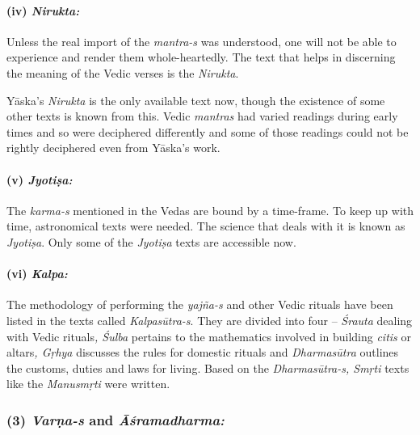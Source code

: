 \paragraph*{(iv) \textit{Nirukta:}}

\vskip -7.3pt

Unless the real import of the \textit{mantra-s} was understood, one will not be able to experience and render them whole-heartedly. The text that helps in discerning the meaning of the Vedic verses is the \textit{Nirukta}.

Yāska’s \textit{Nirukta} is the only available text now, though the existence of some other texts is known from this. Vedic \textit{mantras} had varied readings during early times and so were deciphered differently and some of those readings could not be rightly deciphered even from Yāska’s work.


\paragraph*{(v) \textit{Jyotiṣa:}}

\vskip -7.3pt

The \textit{karma-s} mentioned in the Vedas are bound by a time-frame. To keep up with time, astronomical texts were needed. The science that deals with it is known as \textit{Jyotiṣa}. Only some of the \textit{Jyotiṣa} texts are accessible now.


\paragraph*{(vi) \textit{Kalpa:}}

\vskip -7.3pt

The methodology of performing the \textit{yajña-s} and other Vedic rituals have been listed in the texts called \textit{Kalpasūtra-s}. They are divided into four – \textit{Śrauta} dealing with Vedic rituals\textit{, Śulba} pertains to the mathematics involved in building \textit{citis} or altars\textit{, Gṛhya} discusses the rules for domestic rituals and \textit{Dharmasūtra} outlines the customs, duties and laws for living. Based on the \textit{Dharmasūtra-s, Smṛti} texts like the \textit{Manusmṛti} were written.


\subsubsection*{(3) \textit{Varṇa-s} and \textit{Āśramadharma:}}

